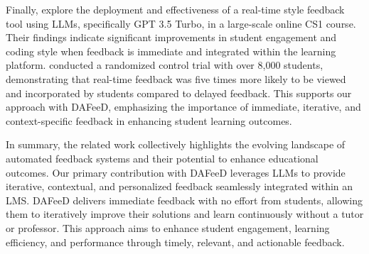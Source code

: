 \documentclass[manuscript,screen,review]{acmart}
\begin{document}
Finally, \citet{woodrow:2024:AITeachesArt} explore the deployment and effectiveness of a real-time style feedback tool using LLMs, specifically GPT 3.5 Turbo, in a large-scale online CS1 course. Their findings indicate significant improvements in student engagement and coding style when feedback is immediate and integrated within the learning platform. \citeauthor{woodrow:2024:AITeachesArt} conducted a randomized control trial with over 8,000 students, demonstrating that real-time feedback was five times more likely to be viewed and incorporated by students compared to delayed feedback. This supports our approach with DAFeeD, emphasizing the importance of immediate, iterative, and context-specific feedback in enhancing student learning outcomes.


In summary, the related work collectively highlights the evolving landscape of automated feedback systems and their potential to enhance educational outcomes. Our primary contribution with DAFeeD leverages LLMs to provide iterative, contextual, and personalized feedback seamlessly integrated within an LMS. DAFeeD delivers immediate feedback with no effort from students, allowing them to iteratively improve their solutions and learn continuously without a tutor or professor. This approach aims to enhance student engagement, learning efficiency, and performance through timely, relevant, and actionable feedback.






\end{document}
